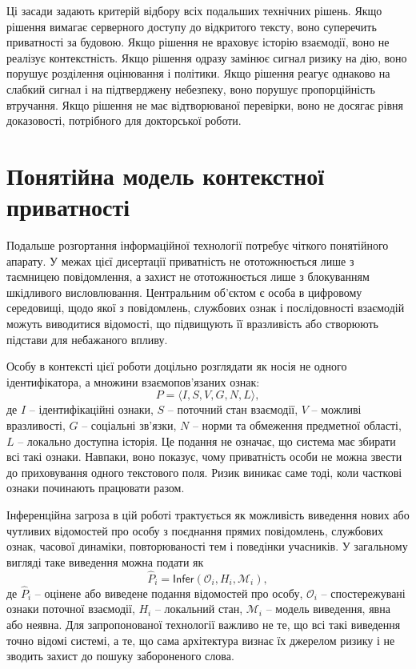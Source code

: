 Ці засади задають критерій відбору всіх подальших технічних рішень. Якщо рішення вимагає серверного доступу до відкритого тексту, воно суперечить приватності за будовою. Якщо рішення не враховує історію взаємодії, воно не реалізує контекстність. Якщо рішення одразу замінює сигнал ризику на дію, воно порушує розділення оцінювання і політики. Якщо рішення реагує однаково на слабкий сигнал і на підтверджену небезпеку, воно порушує пропорційність втручання. Якщо рішення не має відтворюваної перевірки, воно не досягає рівня доказовості, потрібного для докторської роботи.

\section{Понятійна модель контекстної приватності}
\label{sec:conceptual-model}

Подальше розгортання інформаційної технології потребує чіткого понятійного апарату. У межах цієї дисертації приватність не ототожнюється лише з таємницею повідомлення, а захист не ототожнюється лише з блокуванням шкідливого висловлювання. Центральним об'єктом є особа в цифровому середовищі, щодо якої з повідомлень, службових ознак і послідовності взаємодій можуть виводитися відомості, що підвищують її вразливість або створюють підстави для небажаного впливу.

Особу в контексті цієї роботи доцільно розглядати як носія не одного ідентифікатора, а множини взаємопов'язаних ознак:
\begin{equation}
  P =
  \langle I, S, V, G, N, L \rangle,
  \label{eq:person-context}
\end{equation}
де \(I\) -- ідентифікаційні ознаки, \(S\) -- поточний стан взаємодії, \(V\) -- можливі вразливості, \(G\) -- соціальні зв'язки, \(N\) -- норми та обмеження предметної області, \(L\) -- локально доступна історія. Це подання не означає, що система має збирати всі такі ознаки. Навпаки, воно показує, чому приватність особи не можна звести до приховування одного текстового поля. Ризик виникає саме тоді, коли часткові ознаки починають працювати разом.

Інференційна загроза в цій роботі трактується як можливість виведення нових або чутливих відомостей про особу з поєднання прямих повідомлень, службових ознак, часової динаміки, повторюваності тем і поведінки учасників. У загальному вигляді таке виведення можна подати як
\begin{equation}
  \widehat{P}_i =
  \mathsf{Infer}(\mathcal{O}_i, H_i, \mathcal{M}_i),
  \label{eq:inference}
\end{equation}
де \(\widehat{P}_i\) -- оцінене або виведене подання відомостей про особу, \(\mathcal{O}_i\) -- спостережувані ознаки поточної взаємодії, \(H_i\) -- локальний стан, \(\mathcal{M}_i\) -- модель виведення, явна або неявна. Для запропонованої технології важливо не те, що всі такі виведення точно відомі системі, а те, що сама архітектура визнає їх джерелом ризику і не зводить захист до пошуку забороненого слова.

